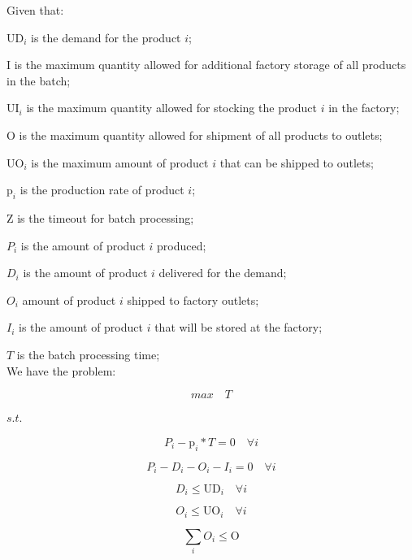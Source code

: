 \documentclass[10pt,fleqn,a4paper,twoside]{article}
\begin{document}
Given that:

$\textrm{UD}_i$ is the demand for the product $i$;

$\textrm{I}$ is the maximum quantity allowed for additional factory storage of all products in the batch;

$\textrm{UI}_i$ is the maximum quantity allowed for stocking the product $i$ in the factory;

$\textrm{O}$ is the maximum quantity allowed for shipment of all products to outlets;

$\textrm{UO}_i$ is the maximum amount of product $i$ that can be shipped to outlets;

$\textrm{p}_i$ is the production rate of product $i$;

$\textrm{Z}$ is the timeout for batch processing;

$P_i$ is the amount of product $i$ produced;

$D_i$ is the amount of product $i$ delivered for the demand;

$O_i$ amount of product $i$ shipped to factory outlets;

$I_i$ is the amount of product $i$ that will be stored at the factory;

$T$ is the batch processing time; \\

We have the problem:

\begin{equation}
\label{MBPTMP01}
max \quad T
\end{equation}

$s.t.$

\begin{equation}
P_i - \textrm{p}_i * T  = 0 \quad \forall i
\end{equation}

\begin{equation}
P_i - D_i - O_i - I_i = 0 \quad \forall i
\end{equation}

\begin{equation}
\label{MBPTMP04}
D_i \leq \textrm{UD}_i \quad \forall i
\end{equation}

\begin{equation}
O_i \leq \textrm{UO}_i \quad \forall i
\end{equation}

\begin{equation}
\sum_i{O_i} \leq \textrm{O}
\end{equation}
\end{document}
